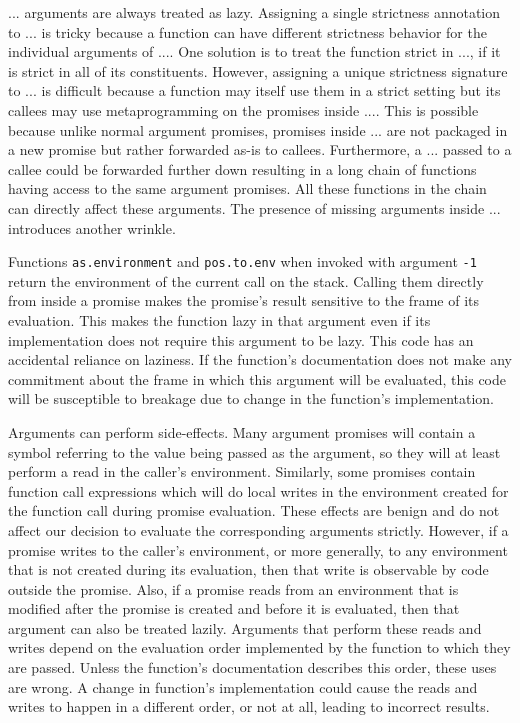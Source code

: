 \documentclass[screen,acmsmall]{acmart}
\newcommand{\code}[1]{\lstinline[style=R]|#1|\xspace}
\begin{document}
$...$ arguments are always treated as lazy. Assigning a single strictness
annotation to $...$ is tricky because a function can have different strictness
behavior for the individual arguments of $...$. One solution is to treat the
function strict in $...$, if it is strict in all of its constituents. However,
assigning a unique strictness signature to $...$ is difficult because a function
may itself use them in a strict setting but its callees may use metaprogramming
on the promises inside $...$. This is possible because unlike normal argument
promises, promises inside $...$ are not packaged in a new promise but rather
forwarded as-is to callees. Furthermore, a $...$ passed to a callee could be
forwarded further down resulting in a long chain of functions having access to
the same argument promises. All these functions in the chain can directly affect
these arguments. The presence of missing arguments inside $...$ introduces
another wrinkle.

Functions \code{as.environment} and \code{pos.to.env} when invoked with argument
\code{-1} return the environment of the current call on the stack. Calling them
directly from inside a promise makes the promise's result sensitive to the frame
of its evaluation. This makes the function lazy in that argument even if its
implementation does not require this argument to be lazy. This code has an
accidental reliance on laziness. If the function's documentation does not make
any commitment about the frame in which this argument will be evaluated, this
code will be susceptible to breakage due to change in the function's
implementation.

Arguments can perform side-effects. Many argument promises will contain a symbol
referring to the value being passed as the argument, so they will at least
perform a read in the caller's environment. Similarly, some promises contain
function call expressions which will do local writes in the environment created
for the function call during promise evaluation. These effects are benign and do
not affect our decision to evaluate the corresponding arguments strictly.
However, if a promise writes to the caller's environment, or more generally, to
any environment that is not created during its evaluation, then that write is
observable by code outside the promise. Also, if a promise reads from an
environment that is modified after the promise is created and before it is
evaluated, then that argument can also be treated lazily. Arguments that perform
these reads and writes depend on the evaluation order implemented by the
function to which they are passed. Unless the function's documentation describes
this order, these uses are wrong. A change in function's implementation could
cause the reads and writes to happen in a different order, or not at all,
leading to incorrect results.
\end{document}
